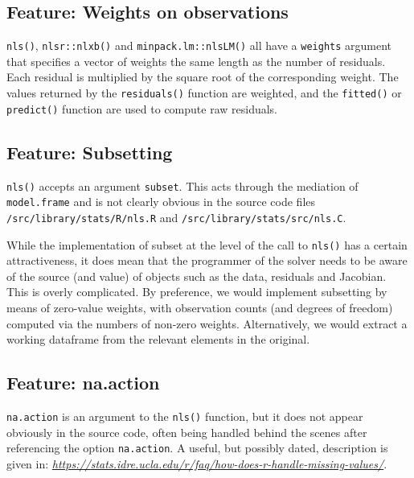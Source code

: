 \documentclass[
]{article}
\begin{document}
\hypertarget{feature-weights-on-observations}{%
\subsection{Feature: Weights on
observations}\label{feature-weights-on-observations}}

\texttt{nls()}, \texttt{nlsr::nlxb()} and \texttt{minpack.lm::nlsLM()}
all have a \texttt{weights} argument that specifies a vector of weights
the same length as the number of residuals. Each residual is multiplied
by the square root of the corresponding weight. The values returned by
the \texttt{residuals()} function are weighted, and the
\texttt{fitted()} or \texttt{predict()} function are used to compute raw
residuals.

\hypertarget{feature-subsetting}{%
\subsection{Feature: Subsetting}\label{feature-subsetting}}

\texttt{nls()} accepts an argument \texttt{subset}. This acts through
the mediation of \texttt{model.frame} and is not clearly obvious in the
source code files \texttt{/src/library/stats/R/nls.R} and
\texttt{/src/library/stats/src/nls.C}.

While the implementation of subset at the level of the call to
\texttt{nls()} has a certain attractiveness, it does mean that the
programmer of the solver needs to be aware of the source (and value) of
objects such as the data, residuals and Jacobian. This is overly
complicated. By preference, we would implement subsetting by means of
zero-value weights, with observation counts (and degrees of freedom)
computed via the numbers of non-zero weights. Alternatively, we would
extract a working dataframe from the relevant elements in the original.

\hypertarget{feature-na.action}{%
\subsection{Feature: na.action}\label{feature-na.action}}

\texttt{na.action} is an argument to the \texttt{nls()} function, but it
does not appear obviously in the source code, often being handled behind
the scenes after referencing the option \texttt{na.action}. A useful,
but possibly dated, description is given in:
\emph{\url{https://stats.idre.ucla.edu/r/faq/how-does-r-handle-missing-values/}}.
\end{document}
